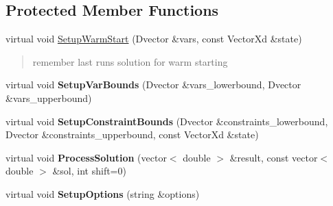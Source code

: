 \subsection*{Protected Member Functions}
\begin{DoxyCompactItemize}
\item 
\mbox{\label{classMPC_aebb4b7be7b8b571e5c542c623cfa1aba}} 
virtual void \mbox{\hyperlink{classMPC_aebb4b7be7b8b571e5c542c623cfa1aba}{Setup\+Warm\+Start}} (Dvector \&vars, const Vector\+Xd \&state)
\begin{DoxyCompactList}\small\item\em \begin{quote}
remember last run\textquotesingle{}s solution for warm starting\end{quote}
\end{DoxyCompactList}\item 
\mbox{\label{classMPC_a85151503d5e29e3832eabfc22dadbc7f}} 
virtual void {\bfseries Setup\+Var\+Bounds} (Dvector \&vars\+\_\+lowerbound, Dvector \&vars\+\_\+upperbound)
\item 
\mbox{\label{classMPC_a0c45ccce078c88436c7db83892efde7c}} 
virtual void {\bfseries Setup\+Constraint\+Bounds} (Dvector \&constraints\+\_\+lowerbound, Dvector \&constraints\+\_\+upperbound, const Vector\+Xd \&state)
\item 
\mbox{\label{classMPC_a37401456da09ec38bcf744d4bfc1ce96}} 
virtual void {\bfseries Process\+Solution} (vector$<$ double $>$ \&result, const vector$<$ double $>$ \&sol, int shift=0)
\item 
\mbox{\label{classMPC_ad15f9e5ae586e33af171a3b09363e432}} 
virtual void {\bfseries Setup\+Options} (string \&options)
\end{DoxyCompactItemize}
